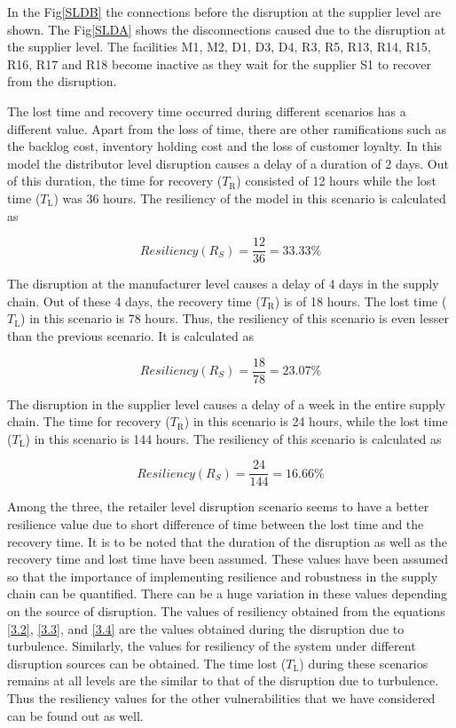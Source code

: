 In the Fig\ref{SLDB} the connections before the disruption at the supplier level are shown. The Fig\ref{SLDA} shows the disconnections caused due to the disruption at the supplier level. The facilities M1, M2, D1, D3, D4, R3, R5, R13, R14, R15, R16, R17 and R18 become inactive as they wait for the supplier S1 to recover from the disruption.

The lost time and recovery time occurred during different scenarios has a different value. Apart from the loss of time, there are other ramifications such as the backlog cost, inventory holding cost and the loss of customer loyalty. In this model the distributor level disruption causes a delay of a duration of 2 days. Out of this duration, the time for recovery ($T_{\text{R}}$) consisted of 12 hours while the lost time ($T_{\text{L}}$) was 36 hours. The resiliency of the model in this scenario is calculated as

\begin{equation}
    Resiliency(R_S) = \frac{12}{36} = 33.33 \% \label{3.2}
\end{equation}

The disruption at the manufacturer level causes a delay of 4 days in the supply chain. Out of these 4 days, the recovery time ($T_{\text{R}}$) is of 18 hours. The lost time ($T_{\text{L}}$) in this scenario is 78 hours. Thus, the resiliency of this scenario is even lesser than the previous scenario. It is calculated as

\begin{equation}
    Resiliency(R_S) = \frac{18}{78} = 23.07 \% \label{3.3}
\end{equation}

The disruption in the supplier level causes a delay of a week in the entire supply chain. The time for recovery ($T_{\text{R}}$) in this scenario is 24 hours, while the lost time ($T_{\text{L}}$) in this scenario is 144 hours. The resiliency of this scenario is calculated as

\begin{equation}
    Resiliency(R_S) = \frac{24}{144} = 16.66 \% \label{3.4}
\end{equation}

Among the three, the retailer level disruption scenario seems to have a better resilience value due to short difference of time between the lost time and the recovery time. It is to be noted that the duration of the disruption as well as the recovery time and lost time have been assumed. These values have been assumed so that the importance of implementing resilience and robustness in the supply chain can be quantified. There can be a huge variation in these values depending on the source of disruption. The values of resiliency obtained from the equations \ref{3.2}, \ref{3.3}, and \ref{3.4} are the values obtained during the disruption due to turbulence. Similarly, the values for resiliency of the system under different disruption sources can be obtained. The time lost ($T_{\text{L}}$) during these scenarios remains at all levels are the similar to that of the disruption due to turbulence. Thus the resiliency values for the other vulnerabilities that we have considered can be found out as well.

